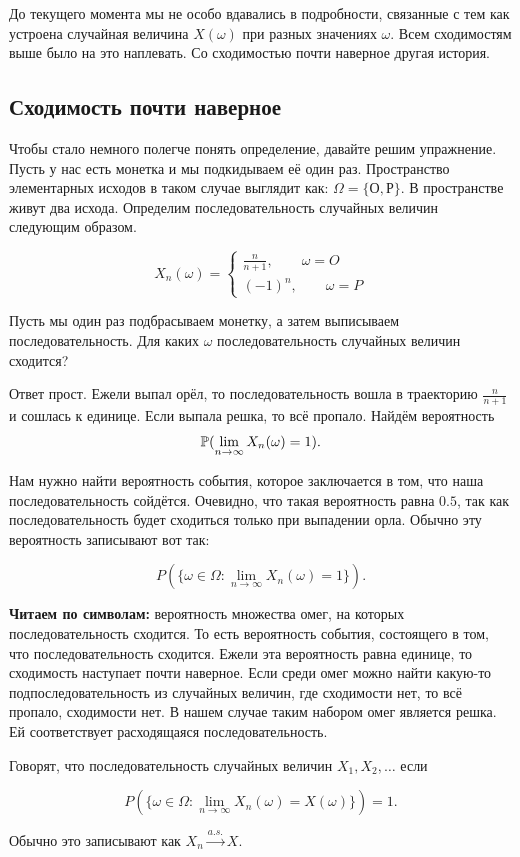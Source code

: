 \documentclass[12pt, a4paper, oneside]{article}
\begin{document}
До текущего момента мы не особо вдавались в подробности, связанные с тем как устроена случайная величина $X(\omega)$ при разных значениях $\omega$. Всем сходимостям выше было на это наплевать. Со сходимостью почти наверное другая история. 

\subsection{Сходимость почти наверное} 

Чтобы стало немного полегче понять определение, давайте решим упражнение. Пусть у нас есть монетка и мы подкидываем её один раз. Пространство элементарных исходов в таком случае выглядит как: $\Omega = \{О, Р\}$. В пространстве живут два исхода. Определим последовательность случайных величин следующим образом.

$$
X_n(\omega) = \begin{cases} \frac{n}{n+1}, \qquad \omega = O \\ (-1)^n, \qquad \omega = P \end{cases}
$$

Пусть мы один раз подбрасываем монетку, а затем выписываем последовательность. Для каких $\omega$ последовательность случайных величин сходится? 

Ответ прост. Ежели выпал орёл, то последовательность вошла в траекторию $\frac{n}{n+1}$ и сошлась к единице. Если выпала решка, то всё пропало. Найдём вероятность $$ \mathbb{P}(\lim_{n \to \infty} X_n(\omega) = 1).$$

Нам нужно найти вероятность события, которое заключается в том, что наша последовательность сойдётся. Очевидно, что такая вероятность равна $0.5$, так как последовательность будет сходиться только при выпадении орла. Обычно эту вероятность записывают вот так: 

$$ P(\{\omega \in \Omega : \lim_{n \to \infty} X_n(\omega) = 1\}).$$

\textbf{Читаем по символам:} вероятность множества омег, на которых последовательность сходится. То есть вероятность события, состоящего в том, что последовательность сходится. Ежели эта вероятность равна единице, то сходимость наступает почти наверное. Если среди омег можно найти какую-то подпоследовательность из случайных величин, где сходимости нет, то всё пропало, сходимости нет. В нашем случае таким набором омег является решка. Ей соответствует расходящаяся последовательность. 

\begin{definition}
Говорят, что последовательность случайных величин $X_1, X_2, \ldots$  если 

$$ P(\{\omega \in \Omega : \lim_{n \to \infty} X_n(\omega) = X(\omega)\}) = 1.$$

Обычно это записывают как $X_n \overset{a.s.}{\to} X.$
\end{definition}
\end{document}
